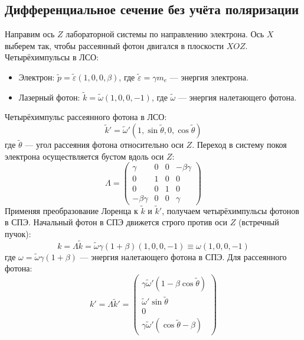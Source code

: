 \documentclass[14pt, a4paper]{extreport}
\begin{document}
\subsection{Дифференциальное сечение без учёта поляризации}
Направим ось $Z$ лабораторной системы по направлению электрона. 
Ось $X$ выберем так, чтобы рассеянный фотон двигался в плоскости $XOZ$. 
Четырёхимпульсы в ЛСО:
\begin{itemize}
    \item Электрон: $\tilde{p} = \tilde{\varepsilon}(1, 0, 0, \beta)$, где $\tilde{\varepsilon} = \gamma m_e$ --- энергия электрона.
    \item Лазерный фотон: $\tilde{k} = \tilde{\omega}(1, 0, 0, -1)$, где $\tilde{\omega}$ --- энергия налетающего фотона.
\end{itemize}
Четырёхимпульс рассеянного фотона в ЛСО:
\begin{equation}
    \tilde{k}' = \tilde{\omega}'(1,\sin\tilde{\theta}, 0, \cos\tilde{\theta})
\end{equation}
где $\tilde{\theta}$ --- угол рассеяния фотона относительно оси $Z$.
Переход в систему покоя электрона осуществляется бустом вдоль оси $Z$:
\begin{equation}
    \Lambda = 
    \begin{pmatrix}
        \gamma & 0 & 0 & -\beta\gamma \\
        0 & 1 & 0 & 0 \\
        0 & 0 & 1 & 0 \\
        -\beta\gamma & 0 & 0 & \gamma
    \end{pmatrix}
\end{equation}
Применяя преобразование Лоренца к $\tilde{k}$ и $\tilde{k}'$, получаем четырёхимпульсы фотонов в СПЭ. 
Начальный фотон в СПЭ движется строго против оси $Z$ (встречный пучок):
\begin{equation}
    k = \Lambda \tilde{k} = \tilde{\omega} \gamma(1+\beta) (1, 0, 0, -1) \equiv \omega (1, 0, 0, -1)
\end{equation}
где $\omega = \tilde{\omega} \gamma(1+\beta)$ --- энергия налетающего фотона в СПЭ.
Для рассеянного фотона:
\begin{equation}
    k' = \Lambda \tilde{k}' = 
    \begin{pmatrix}
        \gamma\tilde{\omega}'(1-\beta\cos\tilde{\theta}) \\
        \tilde{\omega}'\sin\tilde{\theta} \\
        0 \\
        \gamma\tilde{\omega}'(\cos\tilde{\theta} - \beta)
    \end{pmatrix}
\end{equation}
\end{document}
